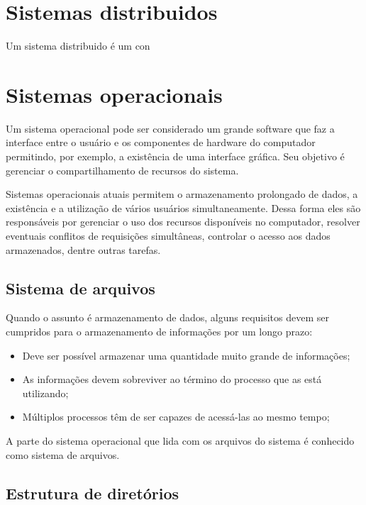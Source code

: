 \section{Sistemas distribuidos}

    Um sistema distribuido é um con

\section{Sistemas operacionais}
    
    Um sistema operacional pode ser considerado um grande software que faz a interface entre o usuário e os componentes de hardware do computador permitindo, por exemplo, a existência de uma interface gráfica. Seu objetivo é gerenciar o compartilhamento de recursos do sistema.
      
    Sistemas operacionais atuais permitem o armazenamento prolongado de dados, a existência e a utilização de vários usuários simultaneamente. Dessa forma eles são responsáveis por gerenciar o uso dos recursos disponíveis no computador, resolver eventuais conflitos de requisições simultâneas, controlar o acesso aos dados armazenados, dentre outras tarefas.

    \subsection{Sistema de arquivos} %
        Quando o assunto é armazenamento de dados, alguns requisitos devem ser cumpridos para o armazenamento de informações por um longo prazo:

        \begin{itemize}
            \item Deve ser possível armazenar uma quantidade muito grande de informações;
            \item As informações devem sobreviver ao término do processo que as está utilizando;
            \item Múltiplos processos têm de ser capazes de acessá-las ao mesmo tempo;
        \end{itemize}

        A parte do sistema operacional que lida com os arquivos do sistema é conhecido como sistema de arquivos.

    \subsection{Estrutura de diretórios}

